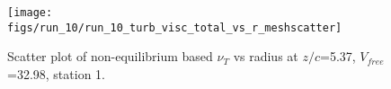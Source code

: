 \begin{figure}[H]
\centering
\texttt{[image: figs/run\_10/run\_10\_turb\_visc\_total\_vs\_r\_meshscatter]}
\caption{Scatter plot of non-equilibrium based $\nu_T$ vs radius at $z/c$=5.37, $V_{free}$=32.98, station 1.}
\label{fig:run_10_turb_visc_total_vs_r_meshscatter}
\end{figure}


